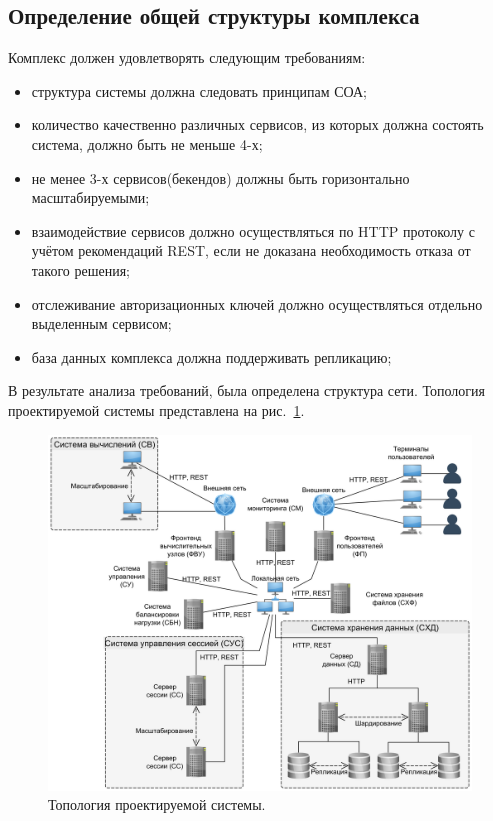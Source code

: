 \documentclass[a4paper,12pt]{report}
\numberwithin{equation}{section}
\begin{document}
  \subsection{Определение общей структуры комплекса}
  Комплекс должен удовлетворять следующим требованиям:
  
  \begin{itemize}
    \item структура системы должна следовать принципам СОА;
    \item количество качественно различных сервисов, из которых должна состоять система, должно быть не меньше 4-х;
    \item не менее 3-х сервисов(бекендов) должны быть горизонтально масштабируемыми;
    \item взаимодействие сервисов должно осуществляться по HTTP протоколу с учётом рекомендаций REST, если не доказана необходимость отказа от такого решения;
    \item отслеживание авторизационных ключей должно осуществляться отдельно выделенным сервисом;
    \item база данных комплекса должна поддерживать репликацию; 
  \end{itemize}
  
  В результате анализа требований, была определена структура сети.
  Топология проектируемой системы представлена на рис.~\ref{fig:common-topology}.
  
  \begin{figure}
    \includegraphics[width=\linewidth]{diagrams/common/topology}
    \caption{Топология проектируемой системы.}
    \label{fig:common-topology}
  \end{figure}
  
\end{document}
